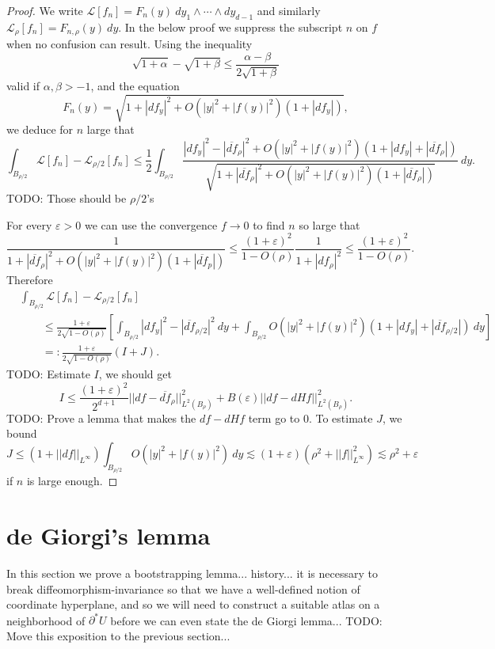 \documentclass[reqno,12pt,letterpaper]{amsart}
\theoremstyle{definition}
\numberwithin{equation}{section}
\begin{document}
\begin{proof}
We write $\mathscr L[f_n] = F_n(y) ~dy_1 \wedge \cdots \wedge dy_{d - 1}$ and similarly $\mathscr L_\rho[f_n] = F_{n,\rho}(y) ~dy$.
In the below proof we suppress the subscript $n$ on $f$ when no confusion can result.
Using the inequality
$$\sqrt{1 + \alpha} - \sqrt{1 + \beta} \leq \frac{\alpha - \beta}{2\sqrt{1 + \beta}}$$
valid if $\alpha,\beta > -1$, and the equation
$$F_n(y) = \sqrt{1 + |df_y|^2 + O(|y|^2 + |f(y)|^2)(1 + |df_y|)},$$
we deduce for $n$ large that
$$\int_{B_{\rho/2}} \mathscr L[f_n] - \mathscr L_{\rho/2}[f_n] \leq \frac{1}{2}\int_{B_{\rho/2}} \frac{|df_y|^2 - |\overline{df}_\rho|^2 + O(|y|^2 + |f(y)|^2)(1 + |df_y| + |\overline{df}_\rho|)}{\sqrt{1 + |\overline{df}_\rho|^2 + O(|y|^2 + |f(y)|^2)(1 + |\overline{df}_\rho|)}} ~dy.$$
TODO: Those should be $\rho/2$'s

For every $\varepsilon > 0$ we can use the convergence $f \to 0$ to find $n$ so large that
$$\frac{1}{1 + |\overline{df}_\rho|^2 + O(|y|^2 + |f(y)|^2)(1 + |\overline{df}_p|)} \leq \frac{(1 + \varepsilon)^2}{1 - O(\rho)} \frac{1}{1 + |df_\rho|^2} \leq \frac{(1 + \varepsilon)^2}{1 - O(\rho)}.$$
Therefore
\begin{align*}
&\int_{B_{\rho/2}} \mathscr L[f_n] - \mathscr L_{\rho/2}[f_n] \\
&\qquad \leq \frac{1 + \varepsilon}{2\sqrt{1 - O(\rho)}} \left[\int_{B_{\rho/2}} |df_y|^2 - |\overline{df}_{\rho/2}|^2 ~dy + \int_{B_{\rho/2}} O(|y|^2 + |f(y)|^2)(1 + |df_y| + |\overline{df}_{\rho/2}|) ~dy\right]\\
&\qquad =: \frac{1 + \varepsilon}{2\sqrt{1 - O(\rho)}}(I + J).
\end{align*}
TODO: Estimate $I$, we should get
$$I \leq \frac{(1 + \varepsilon)^2}{2^{d + 1}} ||df - \overline{df}_\rho||_{L^2(B_\rho)}^2 + B(\varepsilon) ||df - dHf||_{L^2(B_\rho)}^2.$$
TODO: Prove a lemma that makes the $df - dHf$ term go to $0$.
To estimate $J$, we bound
$$J \leq (1 + ||df||_{L^\infty}) \int_{B_{\rho/2}} O(|y|^2 + |f(y)|^2) ~dy \lesssim (1 + \varepsilon)(\rho^2 + ||f||_{L^\infty}^2) \lesssim \rho^2 + \varepsilon$$
if $n$ is large enough.
\end{proof}




\section{de Giorgi's lemma}
In this section we prove a bootstrapping lemma... history...
it is necessary to break diffeomorphism-invariance so that we have a well-defined notion of coordinate hyperplane, and so we will need to construct a suitable atlas on a neighborhood of $\partial^* U$ before we can even state the de Giorgi lemma... TODO: Move this exposition to the previous section...
\end{document}
